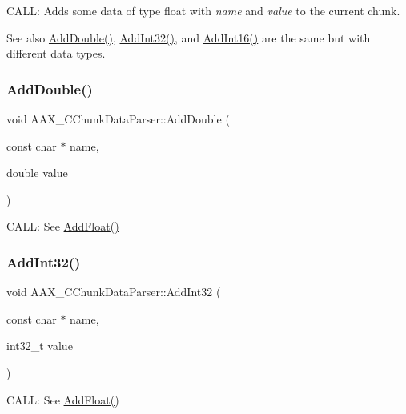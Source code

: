 C\+A\+LL\+: Adds some data of type float with {\itshape name} and {\itshape value} to the current chunk. 

\begin{DoxySeeAlso}{See also}
\mbox{\hyperlink{a01461_a3dc9ec20551559ac3bdae8bf981ace8a}{Add\+Double()}}, \mbox{\hyperlink{a01461_a6000b5c93362f3fe35d59d197f340306}{Add\+Int32()}}, and \mbox{\hyperlink{a01461_a06541319eb6f0628d33518b0485cd8cc}{Add\+Int16()}} are the same but with different data types. 
\end{DoxySeeAlso}
\mbox{\label{a01461_a3dc9ec20551559ac3bdae8bf981ace8a}} 
\subsubsection{\texorpdfstring{AddDouble()}{AddDouble()}}
{\footnotesize\ttfamily void A\+A\+X\+\_\+\+C\+Chunk\+Data\+Parser\+::\+Add\+Double (\begin{DoxyParamCaption}\item[{const char $\ast$}]{name,  }\item[{double}]{value }\end{DoxyParamCaption})}



C\+A\+LL\+: See \mbox{\hyperlink{a01461_aa85606ec7ad6e142abceb1097dcd2480}{Add\+Float()}} 

\mbox{\label{a01461_a6000b5c93362f3fe35d59d197f340306}} 
\subsubsection{\texorpdfstring{AddInt32()}{AddInt32()}}
{\footnotesize\ttfamily void A\+A\+X\+\_\+\+C\+Chunk\+Data\+Parser\+::\+Add\+Int32 (\begin{DoxyParamCaption}\item[{const char $\ast$}]{name,  }\item[{int32\+\_\+t}]{value }\end{DoxyParamCaption})}



C\+A\+LL\+: See \mbox{\hyperlink{a01461_aa85606ec7ad6e142abceb1097dcd2480}{Add\+Float()}} 

